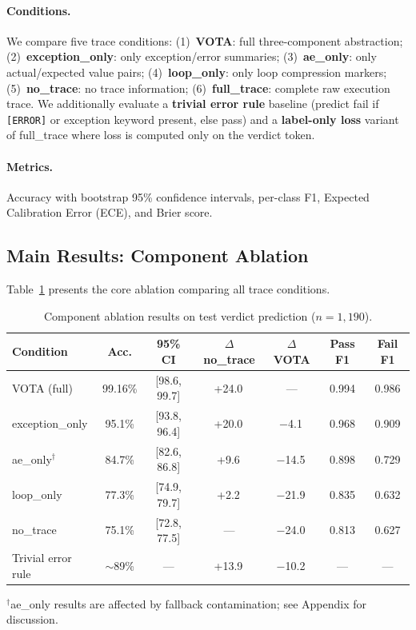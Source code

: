 \documentclass[11pt]{article}
\newcommand{\vota}{\textsc{VOTA}}
\newcommand{\pp}{\,\text{pp}}
\begin{document}
\paragraph{Conditions.} We compare five trace conditions: (1)~\textbf{VOTA}: full three-component abstraction; (2)~\textbf{exception\_only}: only exception/error summaries; (3)~\textbf{ae\_only}: only actual/expected value pairs; (4)~\textbf{loop\_only}: only loop compression markers; (5)~\textbf{no\_trace}: no trace information; (6)~\textbf{full\_trace}: complete raw execution trace. We additionally evaluate a \textbf{trivial error rule} baseline (predict fail if \texttt{[ERROR]} or exception keyword present, else pass) and a \textbf{label-only loss} variant of full\_trace where loss is computed only on the verdict token.

\paragraph{Metrics.} Accuracy with bootstrap 95\% confidence intervals, per-class F1, Expected Calibration Error (ECE), and Brier score.

\subsection{Main Results: Component Ablation}

Table~\ref{tab:ablation} presents the core ablation comparing all trace conditions.

\begin{table}[t]
\centering
\caption{Component ablation results on test verdict prediction ($n{=}1{,}190$).}
\label{tab:ablation}
\small
\begin{tabular}{lcccccc}
\toprule
\textbf{Condition} & \textbf{Acc.} & \textbf{95\% CI} & \textbf{$\Delta$ no\_trace} & \textbf{$\Delta$ VOTA} & \textbf{Pass F1} & \textbf{Fail F1} \\
\midrule
\vota{} (full) & 99.16\% & [98.6, 99.7] & +24.0\pp{} & --- & 0.994 & 0.986 \\
exception\_only & 95.1\% & [93.8, 96.4] & +20.0\pp{} & $-$4.1\pp{} & 0.968 & 0.909 \\
ae\_only$^\dagger$ & 84.7\% & [82.6, 86.8] & +9.6\pp{} & $-$14.5\pp{} & 0.898 & 0.729 \\
loop\_only & 77.3\% & [74.9, 79.7] & +2.2\pp{} & $-$21.9\pp{} & 0.835 & 0.632 \\
no\_trace & 75.1\% & [72.8, 77.5] & --- & $-$24.0\pp{} & 0.813 & 0.627 \\
\midrule
Trivial error rule & $\sim$89\% & --- & +13.9\pp{} & $-$10.2\pp{} & --- & --- \\
\bottomrule
\end{tabular}

\vspace{2pt}
{\footnotesize $^\dagger$ae\_only results are affected by fallback contamination; see Appendix for discussion.}
\end{table}
\end{document}
